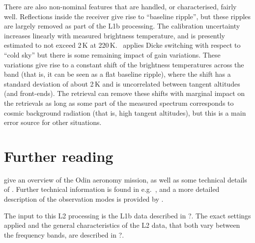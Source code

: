 There are also non-nominal features that are handled, or characterised, fairly
well. Reflections inside the receiver give rise to ``baseline ripple'', but
these ripples are largely removed as part of the L1b processing. The
calibration uncertainty increases linearly with measured brightness
temperature, and is presently estimated to not exceed 2\,K at 220\,K. \smr\
applies Dicke switching with respect to ``cold sky'' but there is some
remaining impact of gain variations. These variations give rise to a constant
shift of the brightness temperatures across the band (that is, it can be seen
as a flat baseline ripple), where the shift has a standard deviation of about
2\,K and is uncorrelated between tangent altitudes (and front-ends). The
retrieval can remove these shifts with marginal impact on the retrievals as
long as some part of the measured spectrum corresponds to cosmic background
radiation (that is, high tangent altitudes), but this is a main error source
for other situations.



\section{Further reading}
\label{sec:reading}
%
\citep{murtagh:anove:02} give an overview of the Odin aeronomy mission, as well
as some technical details of \smr. Further technical information is found in
e.g.\ \citet{eriksson:studi:02}, and a more detailed description of the
observation modes is provided by \citet{merino:studi:02}.

The input to this L2 processing is the L1b data described in ?\addref. The
exact settings applied and the general characteristics of the L2 data, that
both vary between the frequency bands, are described in ?\addref.





